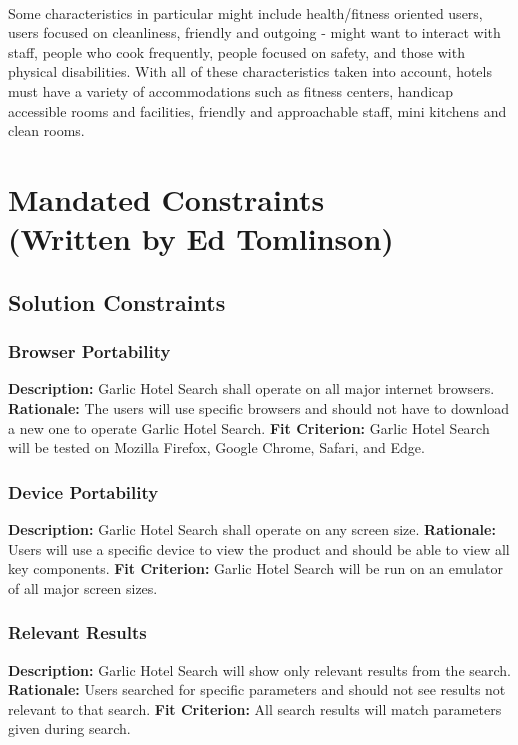 \documentclass[]{article}
\begin{document}
\paragraph{}
Some characteristics in particular might include health/fitness oriented users, users focused on cleanliness, friendly and outgoing - might want to interact with staff, people who cook frequently, people focused on safety, and those with physical disabilities. With all of these characteristics taken into account, hotels must have a variety of accommodations such as fitness centers, handicap accessible rooms and facilities, friendly and approachable staff, mini kitchens and clean rooms.

\section{Mandated Constraints\\ (Written by Ed Tomlinson)}
\subsection{Solution Constraints}

\subsubsection{Browser Portability}
\textbf{Description:} Garlic Hotel Search shall operate on all major internet browsers.\newline
\textbf{Rationale:} The users will use specific browsers and should not have to download a new one to operate Garlic Hotel Search.\newline
\textbf{Fit Criterion:} Garlic Hotel Search will be tested on Mozilla Firefox, Google Chrome, Safari, and Edge.

\subsubsection{Device Portability}
\textbf{Description:} Garlic Hotel Search shall operate on any screen size.\newline
\textbf{Rationale:} Users will use a specific device to view the product and should be able to view all key components.\newline
\textbf{Fit Criterion:} Garlic Hotel Search will be run on an emulator of all major screen sizes.

\subsubsection{Relevant Results}
\textbf{Description:} Garlic Hotel Search will show only relevant results from the search.\newline
\textbf{Rationale:} Users searched for specific parameters and should not see results not relevant to that search.\newline
\textbf{Fit Criterion:} All search results will match parameters given during search.
\end{document}
